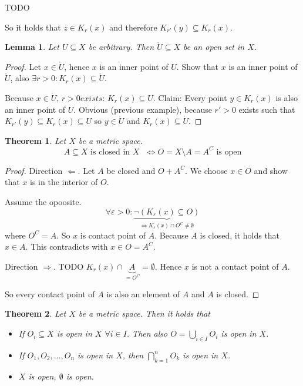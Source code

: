 \documentclass{article}
\newtheorem{theorem}{Theorem}  \numberwithin{theorem}{section}
\newtheorem{lemma}{Lemma}  \numberwithin{lemma}{section}
\begin{document}
TODO

So it holds that $z \in K_r(x)$ and therefore $K_{r'}(y) \subseteq K_r(x)$.

\begin{lemma}
  Let $U \subseteq X$ be arbitrary. Then $\mathring{U} \subseteq X$ be an open set in $X$.
\end{lemma}
\begin{proof}
  Let $x \in \mathring{U}$, hence $x$ is an inner point of $U$.
  Show that $x$ is an inner point of $\mathring{U}$, also $\exists r > 0: K_r(x) \subseteq \mathring{U}$.

  Because $x \in \mathring U$, $r > 0 exists$: $K_r(x) \subseteq U$.
  Claim: Every point $y \in K_r(x)$ is also an inner point of $U$.
  Obvious (previous example), because $r' > 0$ exists such that
  $K_{r'}(y) \subseteq K_r(x) \subseteq U$ so $y \in \mathring U$ and $K_r(x) \subseteq \mathring U$.
\end{proof}

\begin{theorem}
  \label{saetzchen1}
  Let $X$ be a metric space.
  \[ A \subseteq X \text{ is closed in $X$ } \iff O = X \setminus A = A^C \text{ is open} \]
\end{theorem}

\begin{proof}
  Direction $\Leftarrow$.
  Let $A$ be closed and $O + A^C$. We choose $x \in O$ and show that $x$ is in the interior of $O$.

  Assume the opoosite.
  \[ \forall \varepsilon > 0: \underbrace{\neg \left(K_{\varepsilon}(x) \subseteq O\right)}_{\iff K_{\varepsilon}(x) \cap O^C \neq \emptyset} \]
  where $O^C = A$. So $x$ is contact point of $A$. Because $A$ is closed, it holds that $x \in A$.
  This contradicts with $x \in O = A^C$.

  Direction $\Rightarrow$.
  TODO
  $K_r(x) \cap \underbrace{A}_{=O^C} = \emptyset$. Hence $x$ is not a contact point of $A$.

  So every contact point of $A$ is also an element of $A$ and $A$ is closed.
\end{proof}

\begin{theorem}
  \label{satz2}
  Let $X$ be a metric space. Then it holds that
  \begin{itemize}
  	\item
  	  If $O_i \subseteq X$ is open in $X$ $\forall i \in I$.
  	  Then also $O = \bigcup_{i \in I} O_i$ is open in $X$.
  	\item
  	  If $O_1, O_2, \dots, O_n$ is open in $X$, then $\bigcap_{k=1}^n O_k$ is open in $X$.
  	\item
  	  $X$ is open, $\emptyset$ is open.
  \end{itemize}
\end{theorem}
\end{document}
